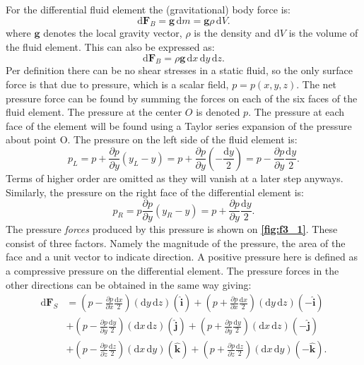 For the differential fluid element the (gravitational) body force is:
\[ 
  \mathrm{d}\textbf{F}_B = \textbf{g} \, \mathrm{d}m = \textbf{g} \rho \, \mathrm{d}V
.\]
where $\textbf{g}$ denotes the local gravity vector, $\rho$ is the density and $\mathrm{d}V$ is the volume of the fluid element. This can also be expressed as:
\[ 
\mathrm{d} \textbf{F}_B = \rho \textbf{g} \, \mathrm{d}x \, \mathrm{d}y \, \mathrm{d}z
.\]
Per definition there can be no shear stresses in a static fluid, so the only surface force is that due to pressure, which is a scalar field, $p = p(x,y,z)$. The net pressure force can be found by summing the forces on each of the six faces of the fluid element. The pressure at the center $O$ is denoted $p$. The pressure at each face of the element will be found using a Taylor series expansion of the pressure about point O. The pressure on the left side of the fluid element is:
\[ 
p_L = p + \frac{\partial p}{\partial y} \left( y_L - y \right) = p + \frac{\partial p}{\partial y} \left( - \frac{\mathrm{d}y}{2} \right) = p - \frac{\partial p}{\partial y} \frac{\mathrm{d}y}{2}
.\]
Terms of higher order are omitted as they will vanish at a later step anyways. Similarly, the pressure on the right face of the differential element is:
\[ 
p_R = p \frac{\partial p}{\partial y} \left( y_R - y \right) = p + \frac{\partial p}{\partial y} \frac{\mathrm{d}y}{2}
.\]
The pressure \textit{forces} produced by this pressure is shown on \textbf{\autoref{fig:f3_1}}. These consist of three factors. Namely the magnitude of the pressure, the area of the face and a unit vector to indicate direction. A positive pressure here is defined as a compressive pressure on the differential element. The pressure forces in the other directions can be obtained in the same way giving:
\begin{align*}
  \mathrm{d}\textbf{F}_S &= \left( p - \frac{\partial p}{\partial x} \frac{\mathrm{d}x}{2} \right) \left( \mathrm{d}y \, \mathrm{d}z \right) \left( \hat{\textbf{i}} \right) + \left( p + \frac{\partial p}{\partial x} \frac{\mathrm{d}x}{2} \right) \left( \mathrm{d}y \, \mathrm{d}z \right) \left( - \hat{\textbf{i}} \right) \\
                         &+ \left( p - \frac{\partial p}{\partial y} \frac{\mathrm{d}y}{2} \right) \left(\mathrm{d}x \, \mathrm{d}z \right) \left( \hat{\textbf{j}} \right) + \left( p + \frac{\partial p}{\partial y} \frac{\mathrm{d}y}{2} \right) \left( \mathrm{d}x \, \mathrm{d}z \right) \left( - \hat{\textbf{j}} \right) \\
                         &+ \left( p - \frac{\partial p}{\partial z} \frac{\mathrm{d}z}{2} \right) \left( \mathrm{d}x \, \mathrm{d}y  \right) \left( \hat{\textbf{k}} \right) + \left( p + \frac{\partial p}{\partial z} \frac{\mathrm{d}z}{2} \right) \left( \mathrm{d}x \, \mathrm{d}y  \right) \left( - \hat{\textbf{k}} \right)
.\end{align*}
